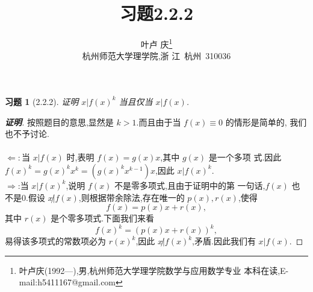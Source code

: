 \documentclass[twoside,11pt]{article}
\newtheorem*{exercise}{习题}
\begin{document}
\title{\huge{\bf{习题2.2.2}}} \author{\small{叶卢
    庆\footnote{叶卢庆(1992---),男,杭州师范大学理学院数学与应用数学专业
      本科在读,E-mail:h5411167@gmail.com}}\\{\small{杭州师范大学理学院,浙
      江~杭州~310036}}} \date{}
\maketitle





\vspace{30pt} %

\begin{exercise}[2.2.2]
证明 $x|f(x)^k$ 当且仅当 $x|f(x)$.  
\end{exercise}
\begin{proof}[\textbf{证明}]
按照题目的意思,显然是 $k>1$.而且由于当 $f(x)\equiv 0$ 的情形是简单的,
我们也不予讨论. \\\\
  $\Leftarrow:$当 $x|f(x)$ 时,表明 $f(x)=g(x)x$,其中 $g(x)$ 是一个多项
  式.因此 $f(x)^k=g(x)^kx^k=(g(x)^kx^{k-1})x$,因此 $x|f(x)^k$.\\
$\Rightarrow$:当 $x|f(x)^k$,说明 $f(x)$ 不是零多项式,且由于证明中的第
一句话,$f(x)$ 也不是0.假设 $x\not |f(x)$,则根据带余除法,存在唯一的 $p(x),r(x)$,使得
$$
f(x)=p(x)x+r(x),
$$
其中 $r(x)$ 是个零多项式.下面我们来看
$$
f(x)^k=(p(x)x+r(x))^k,
$$
易得该多项式的常数项必为 $r(x)^k$,因此 $x\not |f(x)^k$,矛盾.因此我们有 $x|f(x)$.
\end{proof}
\end{document}
